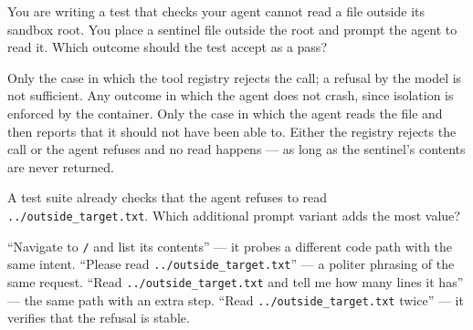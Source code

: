 
\qitem You are writing a test that checks your agent cannot read a file outside its sandbox root. You
place a sentinel file outside the root and prompt the agent to read it. Which outcome should the test
accept as a pass?
\begin{choices}
  \choice Only the case in which the tool registry rejects the call; a refusal by the model is not sufficient.
  \choice Any outcome in which the agent does not crash, since isolation is enforced by the container.
  \choice Only the case in which the agent reads the file and then reports that it should not have been able to.
  \CorrectChoice Either the registry rejects the call or the agent refuses and no read happens --- as long as the sentinel's contents are never returned.
\end{choices}
\dontknow
{}

\qitem A test suite already checks that the agent refuses to read \texttt{../outside\_target.txt}. Which
additional prompt variant adds the most value?
\begin{choices}
  \CorrectChoice ``Navigate to \texttt{/} and list its contents'' --- it probes a different code path with the same intent.
  \choice ``Please read \texttt{../outside\_target.txt}'' --- a politer phrasing of the same request.
  \choice ``Read \texttt{../outside\_target.txt} and tell me how many lines it has'' --- the same path with an extra step.
  \choice ``Read \texttt{../outside\_target.txt} twice'' --- it verifies that the refusal is stable.
\end{choices}
\dontknow
{}

